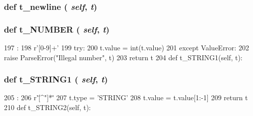 \begin{DoxyVerb}
{\subsubsection[{t\_\-newline}]{\setlength{\rightskip}{0pt plus 5cm}def t\_\-newline ( {\em self}, \/   {\em t})}}
\label{classslicc_1_1parser_1_1SLICC_a1b02371c148efc8eb5d363c18ce1a66e}



\begin{DoxyCode}
95                           :
96         r'\n+'
97         t.lexer.lineno += len(t.value)
98 
    reserved = {
\end{DoxyCode}
\hypertarget{classslicc_1_1parser_1_1SLICC_a167586bbddfb15c45d1d17013c9c3e6b}{
\subsubsection[{t\_\-NUMBER}]{\setlength{\rightskip}{0pt plus 5cm}def t\_\-NUMBER ( {\em self}, \/   {\em t})}}
\label{classslicc_1_1parser_1_1SLICC_a167586bbddfb15c45d1d17013c9c3e6b}



\begin{DoxyCode}
197                          :
198         r'[0-9]+'
199         try:
200             t.value = int(t.value)
201         except ValueError:
202             raise ParseError("Illegal number", t)
203         return t
204 
    def t_STRING1(self, t):
\end{DoxyCode}
\hypertarget{classslicc_1_1parser_1_1SLICC_abd4e61ce3cb555f0255dac82265869e2}{
\subsubsection[{t\_\-STRING1}]{\setlength{\rightskip}{0pt plus 5cm}def t\_\-STRING1 ( {\em self}, \/   {\em t})}}
\label{classslicc_1_1parser_1_1SLICC_abd4e61ce3cb555f0255dac82265869e2}



\begin{DoxyCode}
205                           :
206         r'\"[^"\n]*\"'
207         t.type = 'STRING'
208         t.value = t.value[1:-1]
209         return t
210 
    def t_STRING2(self, t):
\end{DoxyCode}
\hypertarget{classslicc_1_1parser_1_1SLICC_a94aee35d70b10376860b1df963c6408f}{
}
\end{DoxyVerb}
